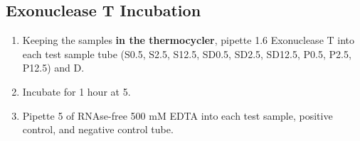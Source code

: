 \documentclass{ssiBio}
\begin{document}
\subsection{Exonuclease T Incubation}

\begin{enumerate}
\item{Keeping the samples \textbf{in the thermocycler}, pipette 1.6 \uL{} Exonuclease T into each test sample tube (S0.5, S2.5, S12.5, SD0.5, SD2.5, SD12.5, P0.5, P2.5, P12.5) and D.}
\item{Incubate for 1 hour at 5\C{}.}
\item{Pipette 5\uL{} of RNAse-free 500 mM EDTA into each test sample, positive control, and negative control tube.}
\end{enumerate}


\stopPoint{}
\end{document}

